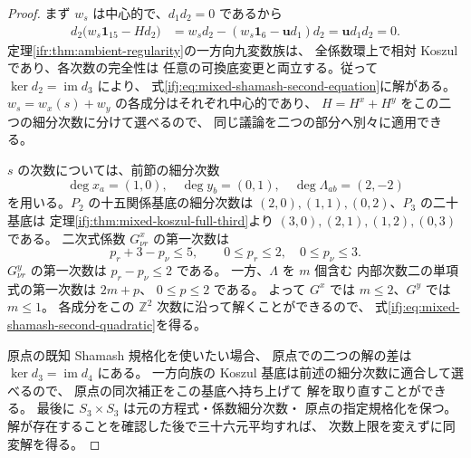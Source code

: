 \begin{proof}
まず $w_s$ は中心的で、$d_1d_2=0$ であるから
\[
 \begin{split}
 d_2\bigl(w_s\mathbf1_{15}-Hd_2\bigr)
 &=w_sd_2-(w_s\mathbf1_6-\mathbf u d_1)d_2
 =\mathbf u d_1d_2=0.
 \end{split}
\]
定理\ref{ifr:thm:ambient-regularity}の一方向九変数族は、
全係数環上で相対 Koszul であり、各次数の完全性は
任意の可換底変更と両立する。従って
$\ker d_2=\operatorname{im}d_3$ により、
式\eqref{ifj:eq:mixed-shamash-second-equation}に解がある。
$w_s=w_x(s)+w_y$ の各成分はそれぞれ中心的であり、
$H=H^x+H^y$ をこの二つの細分次数に分けて選べるので、
同じ議論を二つの部分へ別々に適用できる。

$s$ の次数については、前節の細分次数
\[
 \deg x_a=(1,0),\quad \deg y_b=(0,1),\quad
 \deg\Lambda_{ab}=(2,-2)
\]
を用いる。$P_2$ の十五関係基底の細分次数は
$(2,0),(1,1),(0,2)$、$P_3$ の二十基底は
定理\ref{ifj:thm:mixed-koszul-full-third}より
$(3,0),(2,1),(1,2),(0,3)$ である。
二次式係数 $G^x_{\nu r}$ の第一次数は
\[
  p_r+3-p_\nu\le5,
   \qquad 0\le p_r\le2,\quad0\le p_\nu\le3.
\]
$G^y_{\nu r}$ の第一次数は
$p_r-p_\nu\le2$ である。
一方、$\Lambda$ を $m$ 個含む
内部次数二の単項式の第一次数は $2m+p$、
$0\le p\le2$ である。
よって $G^x$ では $m\le2$、$G^y$ では $m\le1$。
各成分をこの $\mathbb Z^2$ 次数に沿って解くことができるので、
式\eqref{ifj:eq:mixed-shamash-second-quadratic}を得る。

原点の既知 Shamash 規格化を使いたい場合、
原点での二つの解の差は $\ker d_3=\operatorname{im}d_4$ にある。
一方向族の Koszul 基底は前述の細分次数に適合して選べるので、
原点の同次補正をこの基底へ持ち上げて
解を取り直すことができる。
最後に $S_3\times S_3$ は元の方程式・係数細分次数・
原点の指定規格化を保つ。
解が存在することを確認した後で三十六元平均すれば、
次数上限を変えずに同変解を得る。
\end{proof}

